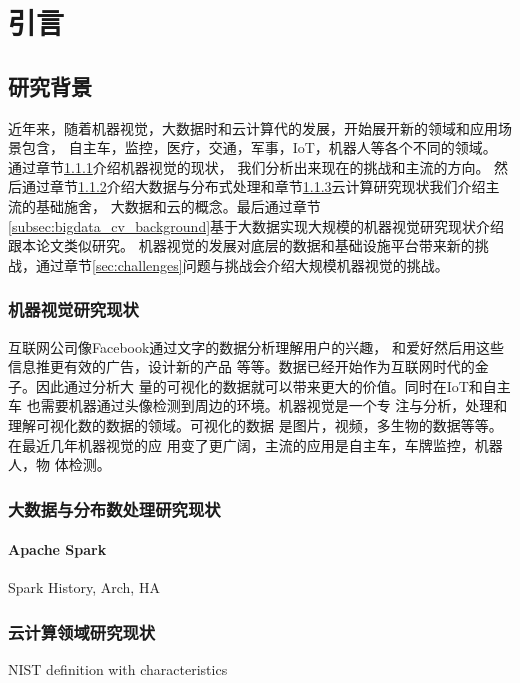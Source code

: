 \chapter{引言}
\label{cha:intro}


\section{研究背景}
\label{sec:background}
近年来，随着机器视觉，大数据时和云计算代的发展，开始展开新的领域和应用场景包含，
自主车，监控，医疗，交通，军事，IoT，机器人等各个不同的领域。
通过章节\ref{subsec:cv_background}介绍机器视觉的现状，
我们分析出来现在的挑战和主流的方向。
然后通过章节\ref{subsec:bigdata_background}介绍大数据与分布式处理和章节\ref{subsec:cloud_background}云计算研究现状我们介绍主流的基础施舍，
大数据和云的概念。最后通过章节\ref{subsec:bigdata_cv_background}基于大数据实现大规模的机器视觉研究现状介绍跟本论文类似研究。
机器视觉的发展对底层的数据和基础设施平台带来新的挑战，通过章节\ref{sec:challenges}问题与挑战会介绍大规模机器视觉的挑战。

\subsection{机器视觉研究现状}
\label{subsec:cv_background}

互联网公司像Facebook通过文字的数据分析理解用户的兴趣，
和爱好然后用这些信息推更有效的广告，设计新的产品
等等。数据已经开始作为互联网时代的金子。因此通过分析大
量的可视化的数据就可以带来更大的价值。同时在IoT和自主车
也需要机器通过头像检测到周边的环境。机器视觉是一个专
注与分析，处理和理解可视化数的数据的领域。可视化的数据
是图片，视频，多生物的数据等等。在最近几年机器视觉的应
用变了更广阔，主流的应用是自主车，车牌监控，机器人，物
体检测。


\subsection{大数据与分布数处理研究现状}
\label{subsec:bigdata_background}

\subsubsection{Apache Spark}
\label{subsubsec:spark}
Spark History, Arch, HA

\subsection{云计算领域研究现状}
\label{subsec:cloud_background}
NIST definition with characteristics

